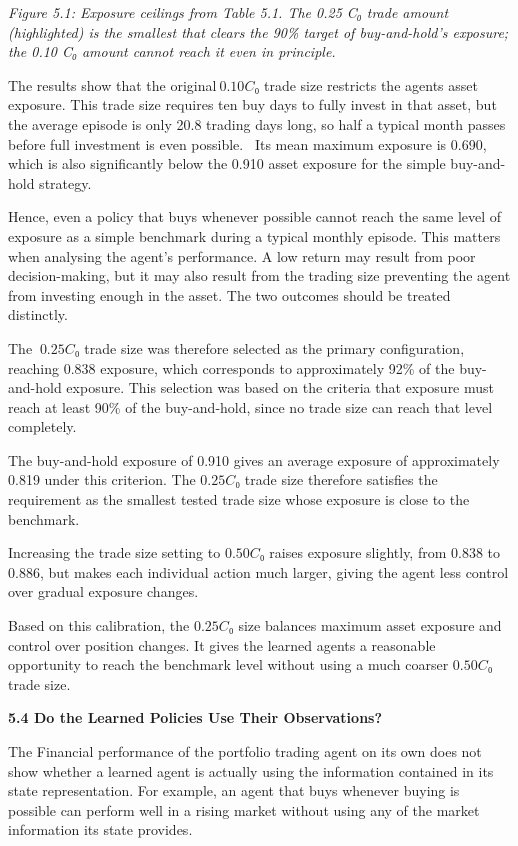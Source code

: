 \emph{Figure 5.1: Exposure ceilings from Table 5.1. The 0.25 C₀ trade
amount (highlighted) is the smallest that clears the 90\% target of
buy-and-hold's exposure; the 0.10 C₀ amount cannot reach it even in
principle.}

The results show that the original\(\ 0.10C₀\) trade size restricts the
agent\textquotesingle s asset exposure. This trade size requires ten buy
days to fully invest in that asset, but the average episode is only 20.8
trading days long, so half a typical month passes before full investment
is even possible.~ Its mean maximum exposure is 0.690, which is also
significantly below the 0.910 asset exposure for the simple buy-and-hold
strategy.

Hence, even a policy that buys whenever possible cannot reach the same
level of exposure as a simple benchmark during a typical monthly
episode. This matters when analysing the agent's performance. A low
return may result from poor decision-making, but it may also result from
the trading size preventing the agent from investing enough in the
asset. The two outcomes should be treated distinctly.

The \(\ 0.25C₀\) trade size was therefore selected as the primary
configuration, reaching 0.838 exposure, which corresponds to
approximately 92\% of the buy-and-hold exposure. This selection was
based on the criteria that exposure must reach at least 90\% of the
buy-and-hold, since no trade size can reach that level completely.

The buy-and-hold exposure of 0.910 gives an average exposure of
approximately 0.819 under this criterion. The \(0.25C₀\) trade size
therefore satisfies the requirement as the smallest tested trade size
whose exposure is close to the benchmark.

Increasing the trade size setting to \(0.50C₀\) raises exposure
slightly, from 0.838 to 0.886, but makes each individual action much
larger, giving the agent less control over gradual exposure changes.

Based on this calibration, the \(0.25C₀\) size balances maximum asset
exposure and control over position changes. It gives the learned agents
a reasonable opportunity to reach the benchmark level without using a
much coarser \(0.50C₀\) trade size.

\textbf{5.4 Do the Learned Policies Use Their Observations?}

The Financial performance of the portfolio trading agent on its own does
not show whether a learned agent is actually using the information
contained in its state representation. For example, an agent that buys
whenever buying is possible can perform well in a rising market without
using any of the market information its state provides.

